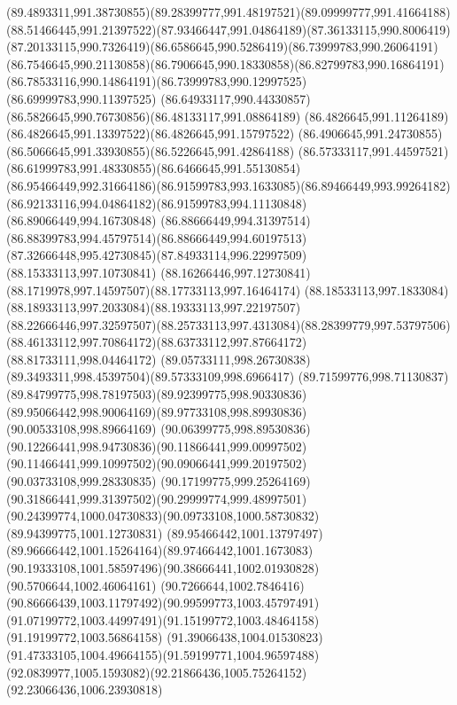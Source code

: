 {{		\curveto(89.4893311,991.38730855)(89.28399777,991.48197521)(89.09999777,991.41664188)
		\curveto(88.51466445,991.21397522)(87.93466447,991.04864189)(87.36133115,990.8006419)
		\curveto(87.20133115,990.7326419)(86.6586645,990.5286419)(86.73999783,990.26064191)
		\curveto(86.7546645,990.21130858)(86.7906645,990.18330858)(86.82799783,990.16864191)
		\curveto(86.78533116,990.14864191)(86.73999783,990.12997525)(86.69999783,990.11397525)
		\curveto(86.64933117,990.44330857)(86.5826645,990.76730856)(86.48133117,991.08864189)
		\curveto(86.4826645,991.11264189)(86.4826645,991.13397522)(86.4826645,991.15797522)
		\curveto(86.4906645,991.24730855)(86.5066645,991.33930855)(86.5226645,991.42864188)
		\curveto(86.57333117,991.44597521)(86.61999783,991.48330855)(86.6466645,991.55130854)
		\curveto(86.95466449,992.31664186)(86.91599783,993.1633085)(86.89466449,993.99264182)
		\curveto(86.92133116,994.04864182)(86.91599783,994.11130848)(86.89066449,994.16730848)
		\curveto(86.88666449,994.31397514)(86.88399783,994.45797514)(86.88666449,994.60197513)
		\curveto(87.32666448,995.42730845)(87.84933114,996.22997509)(88.15333113,997.10730841)
		\curveto(88.16266446,997.12730841)(88.1719978,997.14597507)(88.17733113,997.16464174)
		\curveto(88.18533113,997.1833084)(88.18933113,997.2033084)(88.19333113,997.22197507)
		\curveto(88.22666446,997.32597507)(88.25733113,997.4313084)(88.28399779,997.53797506)
		\curveto(88.46133112,997.70864172)(88.63733112,997.87664172)(88.81733111,998.04464172)
		\curveto(89.05733111,998.26730838)(89.3493311,998.45397504)(89.57333109,998.6966417)
		\curveto(89.71599776,998.71130837)(89.84799775,998.78197503)(89.92399775,998.90330836)
		\curveto(89.95066442,998.90064169)(89.97733108,998.89930836)(90.00533108,998.89664169)
		\curveto(90.06399775,998.89530836)(90.12266441,998.94730836)(90.11866441,999.00997502)
		\curveto(90.11466441,999.10997502)(90.09066441,999.20197502)(90.03733108,999.28330835)
		\curveto(90.17199775,999.25264169)(90.31866441,999.31397502)(90.29999774,999.48997501)
		\curveto(90.24399774,1000.04730833)(90.09733108,1000.58730832)(89.94399775,1001.12730831)
		\curveto(89.95466442,1001.13797497)(89.96666442,1001.15264164)(89.97466442,1001.1673083)
		\curveto(90.19333108,1001.58597496)(90.38666441,1002.01930828)(90.5706644,1002.46064161)
		\curveto(90.7266644,1002.7846416)(90.86666439,1003.11797492)(90.99599773,1003.45797491)
		\curveto(91.07199772,1003.44997491)(91.15199772,1003.48464158)(91.19199772,1003.56864158)
		\curveto(91.39066438,1004.01530823)(91.47333105,1004.49664155)(91.59199771,1004.96597488)
		\curveto(92.0839977,1005.1593082)(92.21866436,1005.75264152)(92.23066436,1006.23930818)
}}
